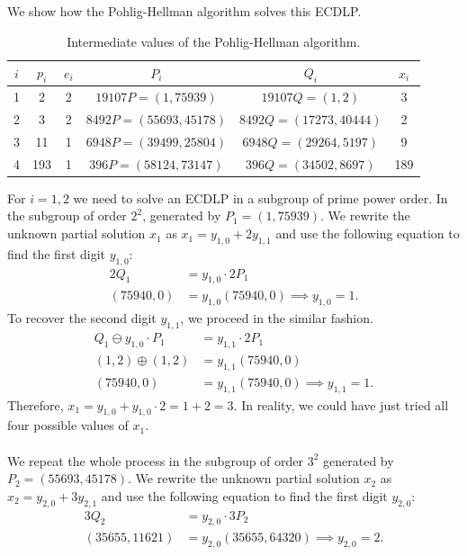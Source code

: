 \documentclass[thesis=M,english]{FITthesis}[2012/10/20]
\theoremstyle{remark}
\theoremstyle{definition}
\begin{document}
\noindent We show how the Pohlig-Hellman algorithm solves this ECDLP. 
\begin{table}[H]
\centering
\begin{tabular}{ |c||c|c|c|c|c| } 
\hline
 $i$ & $p_i$ & $e_i$ & $P_i$ & $Q_i$ & $x_i$  \\
\hline
\hline
1 & 2 & 2 & $19107P = (1, 75939)$ &  $19107Q = (1,2)$ & 3  \\ \hline
2 & 3 & 2 & $8492P = (55693, 45178)$ &  $8492Q = (17273,40444)$ & 2 \\ \hline
3 & 11 & 1 & $6948P = (39499, 25804)$ &  $6948Q = (29264,5197)$ & 9 \\  \hline
4 & 193 & 1 & $396P = (58124, 73147)$ &  $396Q = (34502,8697)$ & 189 \\ \hline
\end{tabular}
\caption[Intermediate values of the Pohlig-Hellman algorithm]{Intermediate values of the Pohlig-Hellman algorithm.}
\label{tblPH}
\end{table}
\noindent For $i=1,2$ we need to solve an ECDLP in a subgroup of prime power order. In the subgroup of order $2^2$, generated by $P_1 = (1, 75939)$. We rewrite the unknown partial solution $x_1$ as $x_1 = y_{1,0} + 2y_{1,1}$ and use the following equation to find the first digit $y_{1,0}$:
\begin{align*}
2Q_1 &= y_{1,0}\cdot2P_1 \\
(75940, 0) &= y_{1,0}(75940, 0) \implies y_{1,0} = 1.
\end{align*}
To recover the second digit $y_{1,1}$, we proceed in the similar fashion.
\begin{align*}
Q_1 \ominus y_{1,0}\cdot P_1 &= y_{1,1}\cdot 2P_1 \\
(1,2) \oplus (1,2) & = y_{1,1}(75940, 0) \\
(75940, 0) &= y_{1,1}(75940, 0) \implies y_{1,1} = 1.
\end{align*}
Therefore, $x_1 = y_{1,0} + y_{1,0}\cdot 2 = 1 + 2 = 3.$ In reality, we could have just tried all four possible values of $x_1$. \\ \\
\noindent We repeat the whole process in the subgroup of order $3^2$ generated by $P_2 = (55693, 45178)$. We rewrite the unknown partial solution $x_2$ as $x_2 = y_{2,0} + 3y_{2,1}$ and use the following equation to find the first digit $y_{2,0}$:
\begin{align*}
3Q_2 &= y_{2,0}\cdot 3P_2 \\
(35655, 11621) &= y_{2,0}(35655, 64320) \implies y_{2,0} = 2.
\end{align*}
\end{document}
